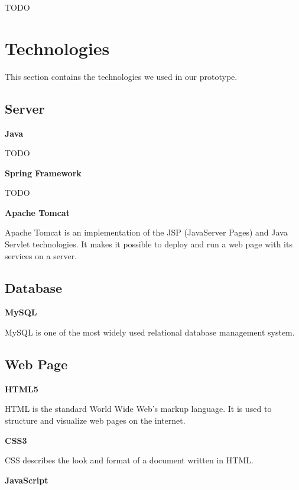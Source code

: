 TODO

\section{Technologies}

This section contains the technologies we used in our prototype.

\subsection{Server}

\textbf{Java}

TODO

\textbf{Spring Framework}

TODO

\textbf{Apache Tomcat}

Apache Tomcat is an implementation of the JSP (JavaServer Pages) and Java Servlet technologies.
It makes it possible to deploy and run a web page with its services on a server.

\subsection{Database}

\textbf{MySQL}

MySQL is one of the most widely used relational database management system.

\subsection{Web Page}

\textbf{HTML5}

HTML is the standard World Wide Web's markup language.
It is used to structure and visualize web pages on the internet.

\textbf{CSS3}

CSS describes the look and format of a document written in HTML.

\textbf{JavaScript}

